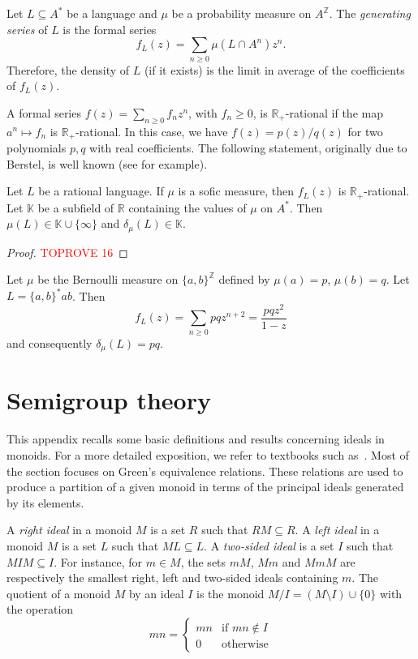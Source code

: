 \documentclass[a4paper,UKenglish,numberwithinsect,cleveref]{lipics-v2021}
\newcommand{\Z}{\mathbb{Z}}
\newcommand{\R}{\mathbb{R}}
\newcommand{\K}{\mathbb{K}}
\begin{document}
Let $L\subseteq A^*$ be a language and $\mu$ be a probability measure on $A^\Z$. The \emph{generating series} of $L$ is the formal series
\[
    f_L(z)=\sum_{n\ge 0}\mu(L\cap A^n)z^n.
\]
Therefore, the density of $L$ (if it exists) is the limit in average of the coefficients of $f_L(z)$.

A formal series $f(z)=\sum_{n\ge 0}f_nz^n$, with $f_n\ge 0$, is $\R_+$-rational if the map $a^n\mapsto f_n$ is $\R_+$-rational. In this case, we have $f(z)=p(z)/q(z)$ for two polynomials $p,q$ with real coefficients. The following statement, originally due to Berstel, is well known (see \cite{Eilenberg1974} for example).
\begin{proposition}\label{propositionBerstel}
    Let $L$ be a rational language. If $\mu$ is a sofic measure, then $f_L(z)$ is $\R_+$-rational. Let $\K$ be a subfield of $\R$ containing the values of $\mu$ on $A^*$. Then $\mu(L)\in \K\cup\{\infty\}$ and $\delta_\mu(L)\in \K$.
\end{proposition}

\begin{proof}\textcolor{red}{TOPROVE 16}\end{proof}

\begin{example}
    Let $\mu$ be the Bernoulli measure on $\{a,b\}^\Z$ defined by $\mu(a)=p$, $\mu(b)=q$.  Let $L=\{a,b\}^*ab$. Then
    \[
        f_L(z)=\sum_{n\ge 0}pqz^{n+2}=\frac{pqz^2}{1-z}
    \]
    and consequently $\delta_\mu(L)=pq$.
\end{example}





\appendix

\section{Semigroup theory}
\label{appendix-semigroups}

This appendix recalls some basic definitions and results concerning ideals in monoids. For a more detailed exposition, we refer to textbooks such as~\cite{BerstelPerrinReutenauer2009,book/Lallement1979,book/Grillet1995,book/Howie1995,Eilenberg1974,Eilenberg1976}. Most of the section focuses on Green's equivalence relations. These relations are used to produce a partition of a given monoid in terms of the principal ideals generated by its elements. 

A \emph{right ideal} in a monoid $M$ is a set $R$ such that $RM\subseteq R$. A \emph{left ideal} in a monoid $M$ is a set $L$ such that $ML\subseteq L$. A \emph{two-sided ideal} is a set $I$ such that $MIM\subseteq I$. For instance, for $m\in M$, the sets $mM$, $Mm$ and $MmM$ are respectively the smallest right, left and two-sided ideals containing $m$. The quotient of a monoid $M$ by an ideal $I$ is the monoid $M/I=(M\setminus I)\cup\{0\}$ with the operation
\begin{displaymath}
    mn=
    \begin{cases}
        mn & \text{if $mn\notin I$}\\
        0  & \text{otherwise}
    \end{cases}
\end{displaymath}
\end{document}
